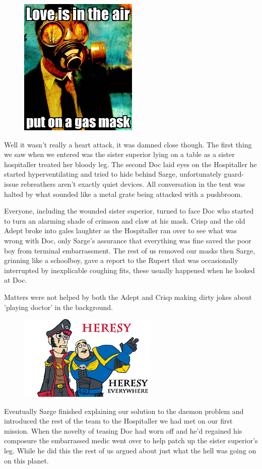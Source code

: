 \begin{figure}
	\begin{center}
		\includegraphics[width=\figwidth]{pics/6/10.png}
	\end{center}
\end{figure}
Well it wasn't really a heart attack, it was damned close though. 
The first thing we saw when we entered was the sister superior lying on a table as a sister hospitaller treated her bloody leg. 
The second Doc laid eyes on the Hospitaller he started hyperventilating and tried to hide behind Sarge, unfortunately guard-issue rebreathers aren't exactly quiet devices. 
All conversation in the tent was halted by what sounded like a metal grate being attacked with a pushbroom. 

Everyone, including the wounded sister superior, turned to face Doc who started to turn an alarming shade of crimson and claw at his mask. 
Crisp and the old Adept broke into gales laughter as the Hospitaller ran over to see what was wrong with Doc, only Sarge's assurance that everything was fine saved the poor boy from terminal embarrassment. 
The rest of us removed our masks then Sarge, grinning like a schoolboy, gave a report to the Rupert that was occasionally interrupted by inexplicable coughing fits, these usually happened when he looked at Doc. 

Matters were not helped by both the Adept and Crisp making dirty jokes about 'playing doctor' in the background.

\begin{figure}
	\begin{center}
		\includegraphics[width=\figwidth]{pics/6/11.png}
	\end{center}
\end{figure}
Eventually Sarge finished explaining our solution to the daemon problem and introduced the rest of the team to the Hospitaller we had met on our first mission. When the novelty of teasing Doc had worn off and he'd regained his composure the embarrassed medic went over to help patch up the sister superior's leg. 
While he did this the rest of us argued about just what the hell was going on on this planet. 

